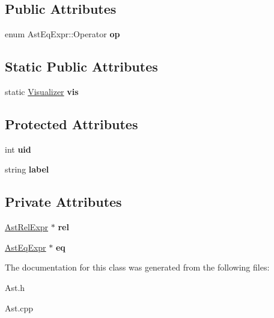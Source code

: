 \subsection*{Public Attributes}
\begin{DoxyCompactItemize}
\item 
\hypertarget{classAstEqExpr_a33d1f50f34d77c20226b92f92112aa56}{enum Ast\-Eq\-Expr\-::\-Operator {\bfseries op}}\label{classAstEqExpr_a33d1f50f34d77c20226b92f92112aa56}

\end{DoxyCompactItemize}
\subsection*{Static Public Attributes}
\begin{DoxyCompactItemize}
\item 
\hypertarget{classAST_aca9e6637209b31e03a09c0d42f29bdfa}{static \hyperlink{classVisualizer}{Visualizer} {\bfseries vis}}\label{classAST_aca9e6637209b31e03a09c0d42f29bdfa}

\end{DoxyCompactItemize}
\subsection*{Protected Attributes}
\begin{DoxyCompactItemize}
\item 
\hypertarget{classAST_a847b778f1c3dd5a19de32de432ee6e15}{int {\bfseries uid}}\label{classAST_a847b778f1c3dd5a19de32de432ee6e15}

\item 
\hypertarget{classAST_ab2e239ccc0688d2341724432ff5a1a31}{string {\bfseries label}}\label{classAST_ab2e239ccc0688d2341724432ff5a1a31}

\end{DoxyCompactItemize}
\subsection*{Private Attributes}
\begin{DoxyCompactItemize}
\item 
\hypertarget{classAstEqExpr_a401f58facf1b9d58e6a6eb1cdb3cb38d}{\hyperlink{classAstRelExpr}{Ast\-Rel\-Expr} $\ast$ {\bfseries rel}}\label{classAstEqExpr_a401f58facf1b9d58e6a6eb1cdb3cb38d}

\item 
\hypertarget{classAstEqExpr_a66192b3d4a06af9796d6d34aa89bb8c7}{\hyperlink{classAstEqExpr}{Ast\-Eq\-Expr} $\ast$ {\bfseries eq}}\label{classAstEqExpr_a66192b3d4a06af9796d6d34aa89bb8c7}

\end{DoxyCompactItemize}


The documentation for this class was generated from the following files\-:\begin{DoxyCompactItemize}
\item 
Ast.\-h\item 
Ast.\-cpp\end{DoxyCompactItemize}
